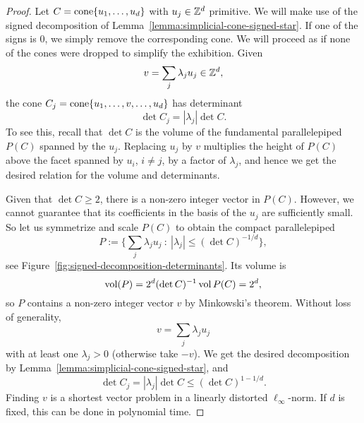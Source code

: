 \begin{proof}
  Let $C = \operatorname{cone}\{ u_1, \ldots, u_d \}$ with $u_j \in \mathbb{Z}^d$ primitive.
  We will make use of the signed decomposition of Lemma~\ref{lemma:simplicial-cone-signed-star}.
  If one of the signs is $0$, we simply remove the corresponding cone.
  We will proceed as if none of the cones were dropped to simplify the exhibition.
  Given
  \[
    v = \sum_j \lambda_j u_j \in \mathbb{Z}^d,
  \]
  the cone $C_j = \operatorname{cone}\{u_1,\ldots,v,\ldots,u_d\}$ has determinant
  \[
    \det C_j = |\lambda_j| \det C.
  \]
  To see this, recall that $\det C$ is the volume of the fundamental parallelepiped $P(C)$ spanned by the $u_j$.
  Replacing $u_j$ by $v$ multiplies the height of $P(C)$ above the facet spanned by $u_i$, $i \neq j$,
  by a factor of $\lambda_j$, and hence we get the desired relation for the volume and determinants.

  Given that $\det C \geq 2$, there is a non-zero integer vector in $P(C)$.
  However, we cannot guarantee that its coefficients in the basis of the $u_j$ are sufficiently small.
  So let us symmetrize and scale $P(C)$ to obtain the compact parallelepiped
  \[
    P := \{ \sum_j \lambda_j u_j ~:~ |\lambda_j| \leq (\det C)^{-1/d} \},
  \]
  see Figure~\ref{fig:signed-decomposition-determinants}.
  Its volume is
  \[
    \operatorname{vol}(P) = 2^d (\det C)^{-1} \operatorname{vol} P(C) = 2^d,
  \]
  so $P$ contains a non-zero integer vector $v$ by Minkowski's theorem.
  Without loss of generality,
  \[
    v = \sum_j \lambda_j u_j
  \]
  with at least one $\lambda_j > 0$ (otherwise take $-v$).
  We get the desired decomposition by Lemma~\ref{lemma:simplicial-cone-signed-star},
  and
  \[
    \det C_j = |\lambda_j| \det C \leq (\det C)^{1-1/d}.
  \]
  Finding $v$ is a shortest vector problem in a linearly distorted $\ell_\infty$-norm.
  If $d$ is fixed, this can be done in polynomial time.
\end{proof}

